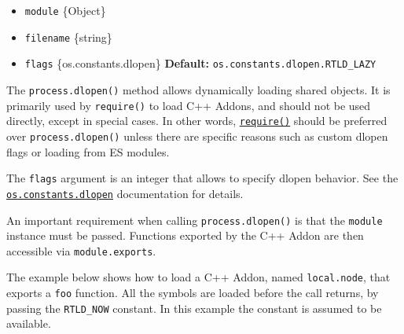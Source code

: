 \begin{itemize}
\tightlist
\item
  \texttt{module} \{Object\}
\item
  \texttt{filename} \{string\}
\item
  \texttt{flags} \{os.constants.dlopen\} \textbf{Default:}
  \texttt{os.constants.dlopen.RTLD\_LAZY}
\end{itemize}

The \texttt{process.dlopen()} method allows dynamically loading shared
objects. It is primarily used by \texttt{require()} to load C++ Addons,
and should not be used directly, except in special cases. In other
words, \href{globals.md\#require}{\texttt{require()}} should be
preferred over \texttt{process.dlopen()} unless there are specific
reasons such as custom dlopen flags or loading from ES modules.

The \texttt{flags} argument is an integer that allows to specify dlopen
behavior. See the
\href{os.md\#dlopen-constants}{\texttt{os.constants.dlopen}}
documentation for details.

An important requirement when calling \texttt{process.dlopen()} is that
the \texttt{module} instance must be passed. Functions exported by the
C++ Addon are then accessible via \texttt{module.exports}.

The example below shows how to load a C++ Addon, named
\texttt{local.node}, that exports a \texttt{foo} function. All the
symbols are loaded before the call returns, by passing the
\texttt{RTLD\_NOW} constant. In this example the constant is assumed to
be available.

\begin{Shaded}
\begin{Highlighting}[]
 \OperatorTok{;}
 \OperatorTok{;}
 \OperatorTok{;}

\OperatorTok{=}\NormalTok{ \{ }\OperatorTok{:}\NormalTok{ \{\} \}}\OperatorTok{;}
\OperatorTok{,} \NormalTok{(} \NormalTok{(}\OperatorTok{,} \NormalTok{))}\OperatorTok{,}
\NormalTok{)}\OperatorTok{;}
\NormalTok{()}\OperatorTok{;}
\end{Highlighting}
\end{Shaded}

